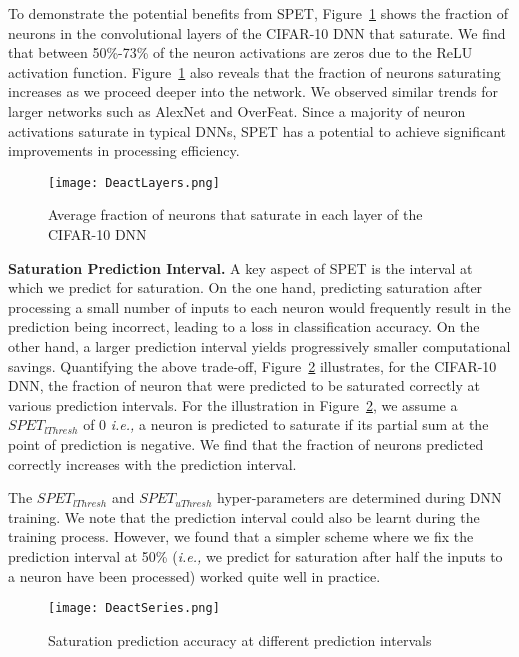 \documentclass{article} %
\begin{document}
To demonstrate the potential benefits from SPET, Figure~\ref{fig:DeactLayer} shows the fraction of neurons in the convolutional layers of the CIFAR-10 DNN that saturate. We find that between 50\%-73\% of the neuron activations are zeros due to the ReLU activation function. Figure~\ref{fig:DeactLayer} also reveals that the fraction of neurons saturating increases as we proceed deeper into the network. We observed similar trends for larger networks such as AlexNet and OverFeat. Since a majority of neuron activations saturate in typical DNNs, SPET has a potential to achieve significant improvements in processing efficiency.

\begin{figure}[h]
\begin{center}
\texttt{[image: DeactLayers.png]}
\end{center}
\caption{Average fraction of neurons that saturate in each layer of the CIFAR-10 DNN}
\label{fig:DeactLayer}
\end{figure}

{\bf \noindent Saturation Prediction Interval.} A key aspect of SPET is the interval at which we predict for saturation. On the one hand, predicting saturation after processing a small number of inputs to each neuron would frequently result in the prediction being incorrect, leading to a loss in classification accuracy. On the other hand, a larger prediction interval yields progressively smaller computational savings. Quantifying the above trade-off, Figure~\ref{fig:DeactSeries} illustrates, for the CIFAR-10 DNN, the fraction of neuron that were predicted to be saturated correctly at various prediction intervals. For the illustration in Figure~\ref{fig:DeactSeries}, we assume a $SPET_{lThresh}$ of 0 \emph{i.e.,} a neuron is predicted to saturate if its partial sum at the point of prediction is negative. We find that the fraction of neurons predicted correctly increases with the prediction interval.

The $SPET_{lThresh}$ and $SPET_{uThresh}$ hyper-parameters are determined during DNN training. We note that the prediction interval could also be learnt during the training process. However, we found that a simpler scheme where we fix the prediction interval at 50\% (\emph{i.e.,} we predict for saturation after half the inputs to a neuron have been processed) worked quite well in practice.

\begin{figure}[htb]
\begin{center}
\texttt{[image: DeactSeries.png]}
\end{center}
\caption{Saturation prediction accuracy at different prediction intervals}
\label{fig:DeactSeries}
\end{figure}
\end{document}
